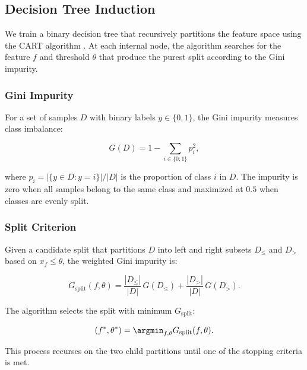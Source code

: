 \subsection{Decision Tree Induction}
\label{sec:tree_induction}

We train a binary decision tree that recursively partitions the feature space using the \ac{CART} algorithm \citep{breiman1984cart}. At each internal node, the algorithm searches for the feature $f$ and threshold $\theta$ that produce the purest split according to the Gini impurity.

\subsubsection{Gini Impurity}

For a set of samples $D$ with binary labels $y \in \{0, 1\}$, the Gini impurity measures class imbalance:

\begin{equation}
G(D) = 1 - \sum_{i \in \{0, 1\}} p_i^2,
\label{eq:gini}
\end{equation}

where $p_i = |\{y \in D : y = i\}| / |D|$ is the proportion of class $i$ in $D$. The impurity is zero when all samples belong to the same class and maximized at $0.5$ when classes are evenly split.

\subsubsection{Split Criterion}

Given a candidate split that partitions $D$ into left and right subsets $D_{\leq}$ and $D_{>}$ based on $x_f \leq \theta$, the weighted Gini impurity is:

\begin{equation}
G_{\text{split}}(f, \theta) = \frac{|D_{\leq}|}{|D|} \, G(D_{\leq}) + \frac{|D_{>}|}{|D|} \, G(D_{>}).
\label{eq:gini_split}
\end{equation}

The algorithm selects the split with minimum $G_{\text{split}}$:

\begin{equation}
(f^*, \theta^*) = \argmin_{f, \theta} G_{\text{split}}(f, \theta).
\label{eq:best_split}
\end{equation}

This process recurses on the two child partitions until one of the stopping criteria is met.

